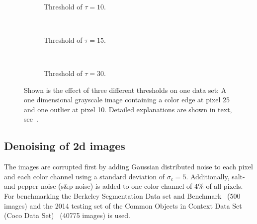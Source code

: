 \begin{figure}[]
  \centering
  \begin{subfigure}[]{\textwidth}
    \centering
    
  \end{subfigure}\vspace{0.25cm}\\
  \begin{subfigure}[]{\textwidth}
    \centering
    
    \caption{Threshold of $\tau = 10$.}
    \label{fig:sensor_experiments_threshold_10}
  \end{subfigure}\\
  \begin{subfigure}[]{\textwidth}
    \centering
    
    \caption{Threshold of $\tau = 15$.}
    \label{fig:sensor_experiments_threshold_15}
  \end{subfigure}\\
  \begin{subfigure}[]{\textwidth}
    \centering
    
    \caption{Threshold of $\tau = 30$.}
    \label{fig:sensor_experiments_threshold_30}
  \end{subfigure}
  \caption{Shown is the effect of three different thresholds on one data set: A one dimensional grayscale image containing a color edge at pixel 25 and one outlier at pixel 10. Detailed explanations are shown in text, see~.}
  \label{fig:sensor_experiments_threshold}
\end{figure}





\subsection{Denoising of 2d images}

The images are corrupted first by  adding Gaussian distributed noise to each pixel and each color channel using a standard deviation of $\sigma_c = 5$. 
Additionally, salt-and-pepper noise (s\&p noise) is added to one color channel of 4\% of all pixels. 
For benchmarking the Berkeley Segmentation Data set and Benchmark~\cite{arbelaez2011contour} (500 images) and the 2014 testing set of the Common Objects in Context Data Set (Coco Data Set)~\cite{lin2014microsoft} (40775 images) is used.

